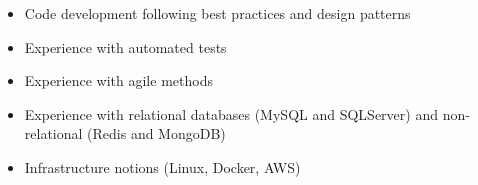 \documentclass[10pt,a4paper,ragged2e,withhyper]{altacv}
\begin{document}
\begin{paracol}{2}

\begin{itemize}
\item Code development following best practices and design patterns
\item Experience with automated tests
\item Experience with agile methods
\item Experience with relational databases (MySQL and SQLServer) and non-relational (Redis and MongoDB)
\item Infrastructure notions (Linux, Docker, AWS)
\end{itemize}


\divider














\medskip


\end{paracol}
\end{document}
